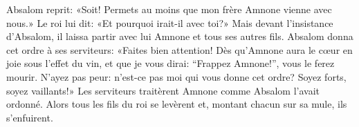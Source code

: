Absalom reprit:
	«Soit! Permets au moins que mon frère Amnone vienne avec nous.»
Le roi lui dit:
		«Et pourquoi irait-il avec toi?»
Mais devant l’insistance d’Absalom,
	il laissa partir avec lui Amnone et tous ses autres fils.
Absalom donna cet ordre à ses serviteurs: «Faites bien attention!
	Dès qu’Amnone aura le cœur en joie sous l’effet du vin,
	et que je vous dirai: “Frappez Amnone!”,
	vous le ferez mourir.
N’ayez pas peur:
		n’est-ce pas moi qui vous donne cet ordre?
	Soyez forts, soyez vaillants!»
Les serviteurs traitèrent Amnone comme Absalom l’avait ordonné.
Alors tous les fils du roi se levèrent et, montant chacun sur sa mule, ils s’enfuirent.
